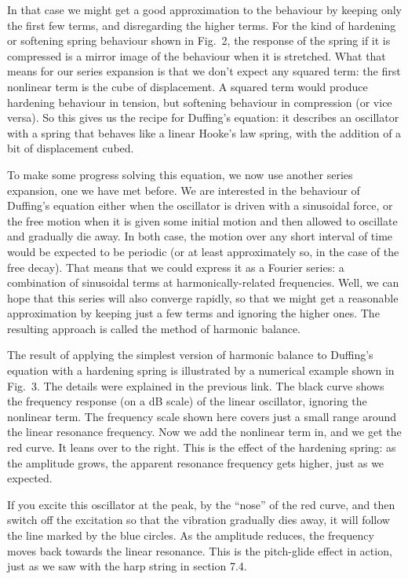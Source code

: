   In that case we might get a good approximation to the behaviour by keeping 
  only the first few terms, and disregarding the higher terms. For the kind of 
  hardening or softening spring behaviour shown in Fig.\ 2, the response of the 
  spring if it is compressed is a mirror image of the behaviour when it is 
  stretched. What that means for our series expansion is that we don’t expect 
  any squared term: the first nonlinear term is the cube of displacement. A 
  squared term would produce hardening behaviour in tension, but softening 
  behaviour in compression (or vice versa). So this gives us the recipe for 
  Duffing’s equation: it describes an oscillator with a spring that behaves 
  like a linear Hooke’s law spring, with the addition of a bit of displacement 
  cubed. 

  To make some progress solving this equation, we now use another series 
  expansion, one we have met before. We are interested in the behaviour of 
  Duffing’s equation either when the oscillator is driven with a sinusoidal 
  force, or the free motion when it is given some initial motion and then 
  allowed to oscillate and gradually die away. In both case, the motion over 
  any short interval of time would be expected to be periodic (or at least 
  approximately so, in the case of the free decay). That means that we could 
  express it as a Fourier series: a combination of sinusoidal terms at 
  harmonically-related frequencies. Well, we can hope that this series will 
  also converge rapidly, so that we might get a reasonable approximation by 
  keeping just a few terms and ignoring the higher ones. The resulting approach 
  is called the method of harmonic balance. 

  The result of applying the simplest version of harmonic balance to Duffing's 
  equation with a hardening spring is illustrated by a numerical example shown 
  in Fig.\ 3. The details were explained in the previous link. The black curve 
  shows the frequency response (on a dB scale) of the linear oscillator, 
  ignoring the nonlinear term. The frequency scale shown here covers just a 
  small range around the linear resonance frequency. Now we add the nonlinear 
  term in, and we get the red curve. It leans over to the right. This is the 
  effect of the hardening spring: as the amplitude grows, the apparent 
  resonance frequency gets higher, just as we expected. 

  If you excite this oscillator at the peak, by the ``nose'' of the red curve, 
  and then switch off the excitation so that the vibration gradually dies away, 
  it will follow the line marked by the blue circles. As the amplitude reduces, 
  the frequency moves back towards the linear resonance. This is the 
  pitch-glide effect in action, just as we saw with the harp string in section 
  7.4. 

